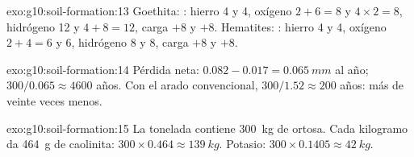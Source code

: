 \begin{solution}{exo:g10:soil-formation:13}
Goethita: : hierro 4 y 4,
oxígeno $2 + 6 = 8$ y $4 \times 2 = 8$, hidrógeno 12 y $4 + 8 = 12$, carga
$+8$ y $+8$. Hematites: : hierro 4
y 4, oxígeno $2 + 4 = 6$ y 6, hidrógeno 8 y 8, carga $+8$ y $+8$.
\end{solution}

\begin{solution}{exo:g10:soil-formation:14}
Pérdida neta: $0.082 - 0.017 = \qty{0.065}{mm}$ al año; $300/0.065 \approx 4600$ años. Con el arado convencional, $300/1.52 \approx 200$ años: más de
veinte veces menos.
\end{solution}

\begin{solution}{exo:g10:soil-formation:15}
La tonelada contiene \qty{300}{kg} de ortosa. Cada kilogramo da
\qty{464}{g} de caolinita: $300 \times 0.464 \approx \qty{139}{kg}$. Potasio:
$300 \times 0.1405 \approx \qty{42}{kg}$.
\end{solution}


